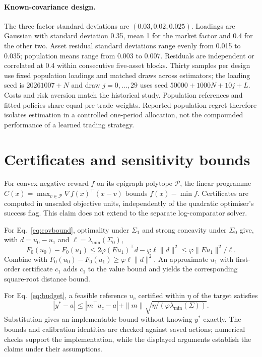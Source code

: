 \documentclass[sigconf,anonymous,review]{acmart}
\begin{document}
\paragraph{Known-covariance design.}
The three factor standard deviations are $(0.03,0.02,0.025)$. Loadings are Gaussian with standard deviation 0.35, mean 1 for the market factor and 0.4 for the other two. Asset residual standard deviations range evenly from 0.015 to 0.035; population means range from 0.003 to 0.007. Residuals are independent or correlated at 0.4 within consecutive five-asset blocks. Thirty samples per design use fixed population loadings and matched draws across estimators; the loading seed is $20261007+N$ and draw $j=0,\ldots,29$ uses seed $50000+1000N+10j+L$. Costs and risk aversion match the historical study. Population references and fitted policies share equal pre-trade weights. Reported population regret therefore isolates estimation in a controlled one-period allocation, not the compounded performance of a learned trading strategy.

\section{Certificates and sensitivity bounds}\label{app:bounds}
For convex negative reward $f$ on its epigraph polytope $\mathcal P$, the linear programme $C(x)=\max_{v\in\mathcal P}\nabla f(x)^\top(x-v)$ bounds $f(x)-\min f$. Certificates are computed in unscaled objective units, independently of the quadratic optimiser's success flag. This claim does not extend to the separate log-comparator solver.

For Eq.\ \eqref{eq:covbound}, optimality under $\Sigma_1$ and strong concavity under $\Sigma_0$ give, with $d=u_0-u_1$ and $\ell=\lambda_{\min}(\Sigma_0)$,
\[
F_0(u_0)-F_0(u_1)\le2\varphi(Eu_1)^\top d-\varphi\ell\|d\|^2
\le\varphi\|Eu_1\|^2/\ell.
\]
Combine with $F_0(u_0)-F_0(u_1)\ge\varphi\ell\|d\|^2$. An approximate $u_1$ with first-order certificate $c_1$ adds $c_1$ to the value bound and yields the corresponding square-root distance bound.

For Eq.\ \eqref{eq:budget}, a feasible reference $u_c$ certified within $\eta$ of the target satisfies
\[
|y^*-a|\le |m^\top u_c-a|+
\|m\|\sqrt{\eta/(\varphi\lambda_{\min}(\Sigma))}.
\]
Substitution gives an implementable bound without knowing $y^*$ exactly. The bounds and calibration identities are checked against saved actions; numerical checks support the implementation, while the displayed arguments establish the claims under their assumptions.
\end{document}
